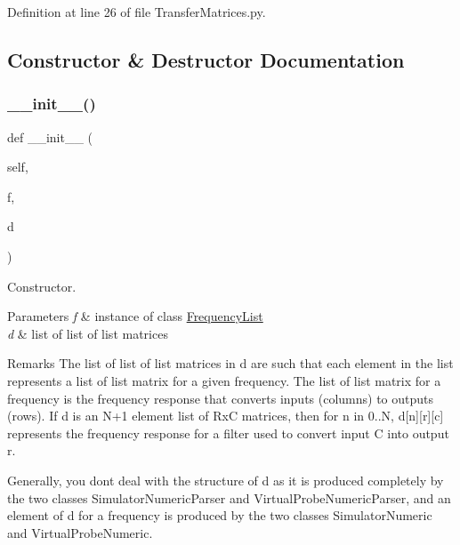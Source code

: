 Definition at line 26 of file Transfer\+Matrices.\+py.



\subsection{Constructor \& Destructor Documentation}
\mbox{\label{classSignalIntegrity_1_1FrequencyDomain_1_1TransferMatrices_1_1TransferMatrices_a7ecbd1152e5e88f11aacf19d825fb16c}} 
\subsubsection{\texorpdfstring{\+\_\+\+\_\+init\+\_\+\+\_\+()}{\_\_init\_\_()}}
{\footnotesize\ttfamily def \+\_\+\+\_\+init\+\_\+\+\_\+ (\begin{DoxyParamCaption}\item[{}]{self,  }\item[{}]{f,  }\item[{}]{d }\end{DoxyParamCaption})}



Constructor. 


\begin{DoxyParams}{Parameters}
{\em f} & instance of class \hyperlink{namespaceSignalIntegrity_1_1FrequencyDomain_1_1FrequencyList}{Frequency\+List} \\
\hline
{\em d} & list of list of list matrices \\
\hline
\end{DoxyParams}
\begin{DoxyRemark}{Remarks}
The list of list of list matrices in d are such that each element in the list represents a list of list matrix for a given frequency. The list of list matrix for a frequency is the frequency response that converts inputs (columns) to outputs (rows). If d is an N+1 element list of RxC matrices, then for n in 0..N, d\mbox{[}n\mbox{]}\mbox{[}r\mbox{]}\mbox{[}c\mbox{]} represents the frequency response for a filter used to convert input C into output r.
\end{DoxyRemark}
Generally, you don\textquotesingle{}t deal with the structure of d as it is produced completely by the two classes Simulator\+Numeric\+Parser and Virtual\+Probe\+Numeric\+Parser, and an element of d for a frequency is produced by the two classes Simulator\+Numeric and Virtual\+Probe\+Numeric. 

